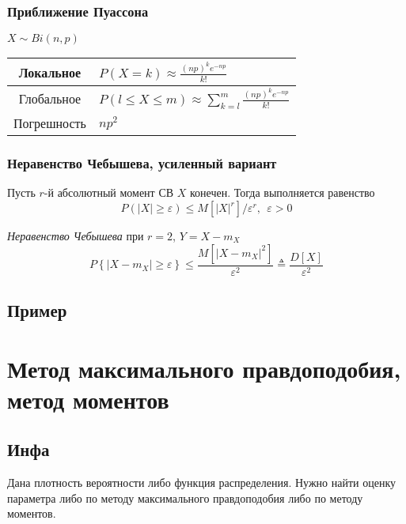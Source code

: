 \documentclass[12pt]{extarticle}
\begin{document}
\subsubsection{Приближение Пуассона}
\begin{center}
$X \sim Bi(n,p)$
\par\begin{tabular}{c|l}
    Локальное &
    $P(X=k)\approx\frac{(np)^{k}e^{-np}}{k!}$
    \\ \hline
    Глобальное &
    $P(l\leqslant X\leqslant m)
    \approx\sum\limits_{k=l}^{m}\frac{(np)^{k}e^{-np}}{k!}$
    \\ \hline
    Погрешность &
    $np^{2}$
\end{tabular}
\end{center}

\subsubsection{Неравенство Чебышева, усиленный вариант}
Пусть $r$-й абсолютный момент СВ $X$ конечен. Тогда выполняется
равенство
\begin{displaymath}
    P(\left|X\right| \geqslant \varepsilon)
    \leqslant M\left[\left|X\right|^{r}\right]/\varepsilon^{r},
    \ \ \varepsilon > 0
\end{displaymath}
\par \textit{Неравенство Чебышева} при $r=2$, $Y=X-m_{X}$
\begin{displaymath}
    P\left\{\left|X-m_{X}\right| \geqslant \varepsilon \right\}
    \leqslant
    \frac{M\left[\left|X-m_{X}\right|^{2}\right]}{\varepsilon^{2}}
    \triangleq \frac{D\left[X\right]}{\varepsilon^{2}}
\end{displaymath}

\subsection{Пример}

\section{Метод максимального правдоподобия, метод моментов}
\subsection{Инфа}
Дана плотность вероятности либо функция распределения. Нужно найти
оценку параметра либо по методу максимального правдоподобия либо по
методу моментов.
\end{document}

